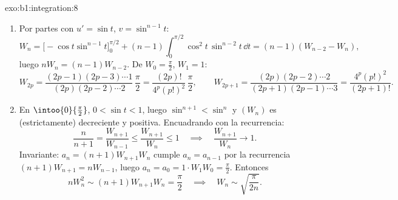 \begin{solution}{exo:b1:integration:8}
\begin{enumerate}
  \item Por partes con $u' = \sin t$, $v = \sin^{n-1} t$:
        \[
        W_n = \bigl[-\cos t\sin^{n-1}t\bigr]_0^{\pi/2}
        + (n-1)\int_0^{\pi/2} \cos^2 t\,\sin^{n-2} t\,\dd t
        = (n-1)(W_{n-2} - W_n),
        \]
        luego $nW_n = (n-1)W_{n-2}$. De $W_0 = \frac\pi2$, $W_1 = 1$:
        \[
        W_{2p} = \frac{(2p-1)(2p-3)\cdots 1}{(2p)(2p-2)\cdots 2}\,
        \frac{\pi}{2} = \frac{(2p)!}{4^p (p!)^2}\,\frac\pi2,
        \qquad
        W_{2p+1} = \frac{(2p)(2p-2)\cdots 2}{(2p+1)(2p-1)\cdots 3}
        = \frac{4^p (p!)^2}{(2p+1)!} .
        \]
  \item En $\intoo{0}{\frac\pi2}$, $0 < \sin t < 1$, luego
        $\sin^{n+1} < \sin^n$ y $(W_n)$ es (estrictamente)
        decreciente y positiva. Encuadrando con la recurrencia:
        \[
        \frac{n}{n+1} = \frac{W_{n+1}}{W_{n-1}}
        \leq \frac{W_{n+1}}{W_n} \leq 1
        \quad\implies\quad \frac{W_{n+1}}{W_n} \to 1 .
        \]
        Invariante: $a_n = (n+1)W_{n+1}W_n$ cumple $a_n = a_{n-1}$
        por la recurrencia $(n+1)W_{n+1} = nW_{n-1}$, luego
        $a_n = a_0 = 1 \cdot W_1 W_0 = \frac\pi2$. Entonces
        \[
        n W_n^2 \sim (n+1) W_{n+1} W_n = \frac\pi2
        \quad\implies\quad
        W_n \sim \sqrt{\frac{\pi}{2n}} .
        \]
\end{enumerate}
\end{solution}

